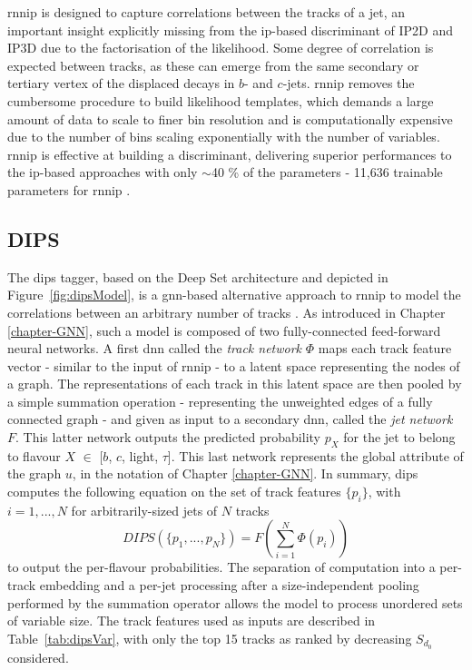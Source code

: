 \gls{rnnip} is designed to capture correlations between the tracks of a jet, an important insight explicitly missing from the \gls{ip}-based discriminant of IP2D and IP3D due to the factorisation of the likelihood. Some degree of correlation is expected between tracks, as these can emerge from the same secondary or tertiary vertex of the displaced decays in $b$- and $c$-jets. \gls{rnnip} removes the cumbersome procedure to build likelihood templates, which demands a large amount of data to scale to finer bin resolution and is computationally expensive due to the number of bins scaling exponentially with the number of variables. \gls{rnnip} is effective at building a discriminant, delivering superior performances to the \gls{ip}-based approaches with only $\sim$40 \% of the parameters - 11,636 trainable parameters for \gls{rnnip} \cite{Paganini:2289214}.

\subsection{DIPS}
The \gls{dips} tagger, based on the Deep Set architecture \cite{NIPS2017f22e4747} and depicted in Figure~\ref{fig:dipsModel}, is a \gls{gnn}-based alternative approach to \gls{rnnip} to model the correlations between an arbitrary number of tracks \cite{ATL-PHYS-PUB-2020-014}. As introduced in Chapter \ref{chapter-GNN}, such a model is composed of two fully-connected feed-forward neural networks. A first \gls{dnn} called the \textit{track network} $\Phi$ maps each track feature vector - similar to the input of \gls{rnnip} - to a latent space representing the nodes of a graph. The representations of each track in this latent space are then pooled by a simple summation operation - representing the unweighted edges of a fully connected graph - and given as input to a secondary \gls{dnn}, called the \textit{jet network} $F$. This latter network outputs the predicted probability $p_X$ for the jet to belong to flavour $X$ $\in$ [$b$, $c$, light, $\tau$]. This last network represents the global attribute of the graph $u$, in the notation of Chapter \ref{chapter-GNN}. 
In summary, \gls{dips} computes the following equation on the set of track features $\{ p_i \}$, with $i = 1, ..., N$ for arbitrarily-sized jets of $N$ tracks
\begin{equation}
  DIPS( \{p_1, ..., p_N \} ) = F\left( \sum_{i=1}^N \Phi(p_i) \right)
\end{equation}
to output the per-flavour probabilities. The separation of computation into a per-track embedding and a per-jet processing after a size-independent pooling performed by the summation operator allows the model to process unordered sets of variable size. The track features used as inputs are described in Table~\ref{tab:dipsVar}, with only the top 15 tracks as ranked by decreasing $S_{d_0}$ considered.

